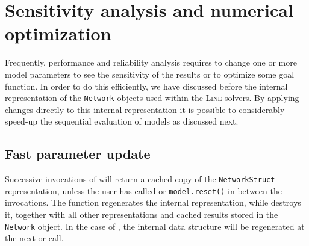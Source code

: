\section{Sensitivity analysis and numerical optimization}
\label{sensitivity-analysis-and-numerical-optimization}
Frequently, performance and reliability analysis requires to change one or more model parameters to see the sensitivity of the results or to optimize some goal function. In order to do this efficiently, we have discussed before the internal representation of the \texttt{Network} objects used within the \textsc{Line} solvers. By applying changes directly to this internal representation it is possible to considerably speed-up the sequential evaluation of  models as discussed next.

\subsection{Fast parameter update}
Successive invocations of  will return a cached copy of the \texttt{NetworkStruct} representation, unless the user has called  or \texttt{model.reset()} in-between the invocations. The  function regenerates the internal representation, while  destroys it, together with all other representations and cached results stored in the \texttt{Network} object. In the case of , the internal data structure will be regenerated at the next  or  call.

